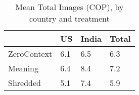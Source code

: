 \begin{table}[htbp]
\caption{\label{ImgsByGroup_COP} Mean Total Images (COP), by country and treatment}\centering\medskip
\begin{tabular}{|l|l|l|l|}\hline  
 & US  & India  & Total  \\ \hline  
ZeroContext & 6.1 & 6.5 & 6.3 \\ \hline 
Meaning & 6.4 & 8.4 & 7.2 \\ \hline 
Shredded & 5.1 & 7.4 & 5.9 \\ \hline 
  \end{tabular}
\end{table}
